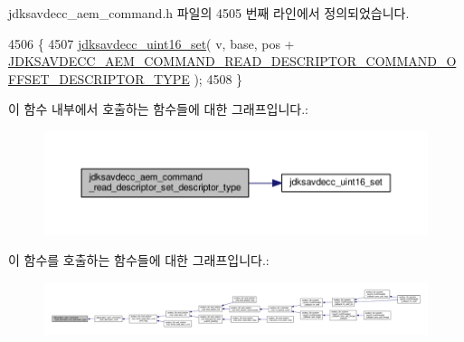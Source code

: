 jdksavdecc\+\_\+aem\+\_\+command.\+h 파일의 4505 번째 라인에서 정의되었습니다.


\begin{DoxyCode}
4506 \{
4507     \hyperlink{group__endian_ga14b9eeadc05f94334096c127c955a60b}{jdksavdecc\_uint16\_set}( v, base, pos + 
      \hyperlink{group__command__read__descriptor_ga110f254c3beab0e11e954498cd7e16c5}{JDKSAVDECC\_AEM\_COMMAND\_READ\_DESCRIPTOR\_COMMAND\_OFFSET\_DESCRIPTOR\_TYPE}
       );
4508 \}
\end{DoxyCode}


이 함수 내부에서 호출하는 함수들에 대한 그래프입니다.\+:
\nopagebreak
\begin{figure}[H]
\begin{center}
\leavevmode
\includegraphics[width=350pt]{group__command__read__descriptor_ga519406e2fdb65c3bb2076f110806a3ab_cgraph}
\end{center}
\end{figure}




이 함수를 호출하는 함수들에 대한 그래프입니다.\+:
\nopagebreak
\begin{figure}[H]
\begin{center}
\leavevmode
\includegraphics[width=350pt]{group__command__read__descriptor_ga519406e2fdb65c3bb2076f110806a3ab_icgraph}
\end{center}
\end{figure}


